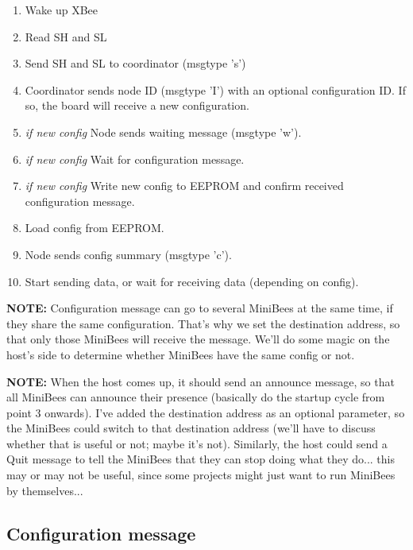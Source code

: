 \documentclass[letterpaper,10pt]{article}
\begin{document}
\begin{enumerate}
 \item Wake up XBee
 \item Read SH and SL
 \item Send SH and SL to coordinator (msgtype 's')
 \item Coordinator sends node ID (msgtype 'I') with an optional configuration ID. If so, the board will receive a new configuration.
 \item \textit{if new config} Node sends waiting message (msgtype 'w').
 \item \textit{if new config} Wait for configuration message.
 \item \textit{if new config} Write new config to EEPROM and confirm received configuration message.
 \item Load config from EEPROM.
 \item Node sends config summary (msgtype 'c').
 \item Start sending data, or wait for receiving data (depending on config).
\end{enumerate}

\textbf{NOTE:} Configuration message can go to several MiniBees at the same time, if they share the same configuration. That's why we set the destination address, so that only those MiniBees will receive the message. We'll do some magic on the host's side to determine whether MiniBees have the same config or not.

\textbf{NOTE:} When the host comes up, it should send an announce message, so that all MiniBees can announce their presence (basically do the startup cycle from point 3 onwards). I've added the destination address as an optional parameter, so the MiniBees could switch to that destination address (we'll have to discuss whether that is useful or not; maybe it's not). Similarly, the host could send a Quit message to tell the MiniBees that they can stop doing what they do... this may or may not be useful, since some projects might just want to run MiniBees by themselves...

\subsection{Configuration message}
\end{document}
